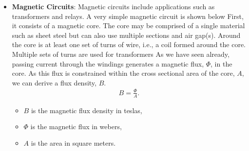 \documentclass{report}
\begin{document}
\begin{itemize}
            \bigbreak \noindent 
            \bigbreak \noindent 
            This results in a back-and-forth motion of the diaphragm that echoes the shape of the waveform being fed from the amplifier. As the diaphragm pushes against the air, it sets up a pressure wave, and we have sound.
            \bigbreak \noindent 
            A dynamic microphone runs the sequence in reverse. First, the diaphragm will move back and forth in accordance to an applied sound wave. This causes the voice coil to move back and forth within the field of the permanent magnet. We now have a coil of wire being cut by magnetic lines of force, and by Faraday's law of induction, this means that a voltage will be induced in the coil. As long as the diaphragm can respond to the subtle changes in the acoustic pressure wave, then the resulting induced voltage should be of high fidelity. Clearly, to do this with great accuracy, the diaphragm/voice coil/suspension assembly will need to very light and nimble, meaning that the components of the microphone will tend to be much smaller than those of a loudspeaker.
        \item \textbf{Magnetic Circuits}: Magnetic circuits include applications such as transformers and relays. A very simple magnetic circuit is shown below
            \bigbreak \noindent 
            \bigbreak \noindent 
            First, it consists of a magnetic core. The core may be comprised of a single material such as sheet steel but can also use multiple sections and air gap(s). Around the core is at least one set of turns of wire, i.e., a coil formed around the core. Multiple sets of turns are used for transformers
            \bigbreak \noindent 
            As we have seen already, passing current through the windings generates a magnetic flux, $\Phi$, in the core. As this flux is constrained within the cross sectional area of the core, $A$, we can derive a flux density, $B$.
            \begin{align*}
                B = \frac{\Phi}{A}
            .\end{align*}
            \begin{itemize}
                \item $B$ is the magnetic flux density in teslas,
                \item $\Phi$ is the magnetic flux in webers,
                \item $A$ is the area in square meters.
            \end{itemize}

\end{itemize}
\end{document}
